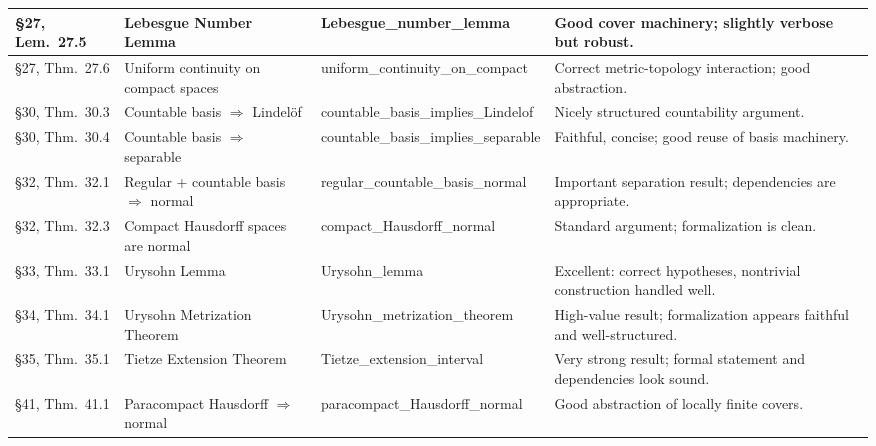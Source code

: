 \documentclass[a4paper,UKenglish,cleveref, autoref, thm-restate]{lipics-v2021}
\newcommand{\formal}[1]{{\ttfamily\small #1}}
\begin{document}
\begin{longtable}{|p{2.6cm}|p{2.8cm}|p{3.1cm}|p{4.9cm}|}
§27, Lem.\ 27.5 &
Lebesgue Number Lemma &
\formal{Lebesgue\_\allowbreak number\_\allowbreak lemma} &
Good cover machinery; slightly verbose but robust. \\
\hline

§27, Thm.\ 27.6 &
Uniform continuity on compact spaces &
\formal{uniform\_\allowbreak continuity\_\allowbreak on\_\allowbreak compact} &
Correct metric-topology interaction; good abstraction. \\
\hline

§30, Thm.\ 30.3 &
Countable basis $\Rightarrow$ Lindelöf &
\formal{countable\_\allowbreak basis\_\allowbreak implies\_\allowbreak Lindelof} &
Nicely structured countability argument. \\
\hline

§30, Thm.\ 30.4 &
Countable basis $\Rightarrow$ separable &
\formal{countable\_\allowbreak basis\_\allowbreak implies\_\allowbreak separable} &
Faithful, concise; good reuse of basis machinery. \\
\hline

§32, Thm.\ 32.1 &
Regular + countable basis $\Rightarrow$ normal &
\formal{regular\_\allowbreak countable\_\allowbreak basis\_\allowbreak normal} &
Important separation result; dependencies are appropriate. \\
\hline

§32, Thm.\ 32.3 &
Compact Hausdorff spaces are normal &
\formal{compact\_\allowbreak Hausdorff\_\allowbreak normal} &
Standard argument; formalization is clean. \\
\hline

§33, Thm.\ 33.1 &
Urysohn Lemma &
\formal{Urysohn\_\allowbreak lemma} &
Excellent: correct hypotheses, nontrivial construction handled well. \\
\hline

§34, Thm.\ 34.1 &
Urysohn Metrization Theorem &
\formal{Urysohn\_\allowbreak metrization\_\allowbreak theorem} &
High-value result; formalization appears faithful and well-structured. \\
\hline

§35, Thm.\ 35.1 &
Tietze Extension Theorem &
\formal{Tietze\_\allowbreak extension\_\allowbreak interval} &
Very strong result; formal statement and dependencies look sound. \\
\hline

§41, Thm.\ 41.1 &
Paracompact Hausdorff $\Rightarrow$ normal &
\formal{paracompact\_\allowbreak Hausdorff\_\allowbreak normal} &
Good abstraction of locally finite covers. \\
\hline


\end{longtable}
\end{document}
